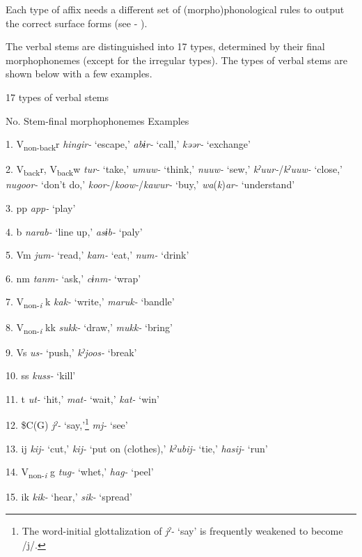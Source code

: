 Each type of affix needs a different set of (morpho)phonological rules to output the correct surface forms (see  - ).

The verbal stems are distinguished into 17 types, determined by their final morphophonemes (except for the irregular types). The types of verbal stems are shown below with a few examples.

\begin{table}
\caption{\label{tab:key:57}17 types of verbal stems}

No.  Stem-final morphophonemes  Examples

1.  V\textsubscript{non-back}r  \textit{hingir-} ‘escape,’ \textit{abɨr-} ‘call,’ \textit{kəər-} ‘exchange’

2.  V\textsubscript{back}r, V\textsubscript{back}w  \textit{tur-} ‘take,’ \textit{umuw-} ‘think,’ \textit{nuuw-} ‘sew,’ \textit{kˀuur-}/\textit{kˀuuw-} ‘close,’ \textit{nugoor-} ‘don’t do,’ \textit{koor-}/\textit{koow-}/\textit{kawur-} ‘buy,’ \textit{wa}(\textit{k})\textit{ar-} ‘understand’

3.  pp  \textit{app-} ‘play’

4.  b  \textit{narab-} ‘line up,’ \textit{asɨb-} ‘paly’

5.  Vm  \textit{jum-} ‘read,’ \textit{kam-} ‘eat,’ \textit{num-} ‘drink’

6.  nm  \textit{tanm-} ‘ask,’ \textit{cɨnm-} ‘wrap’

7.  V\textsubscript{non-}\textit{\textsubscript{i} }k  \textit{kak-} ‘write,’ \textit{maruk-} ‘bandle’

8.  V\textsubscript{non-}\textit{\textsubscript{i} }kk  \textit{sukk-} ‘draw,’ \textit{mukk-} ‘bring’

9.  Vs  \textit{us-} ‘push,’ \textit{kˀjoos-} ‘break’

10.  ss  \textit{kuss-} ‘kill’

11.  t  \textit{ut-} ‘hit,’ \textit{mat-} ‘wait,’ \textit{kat-} ‘win’

12.  \$C(G)  \textit{jˀ-} ‘say,’\footnote{The word-initial glottalization of \textit{jˀ-} ‘say’ is frequently weakened to become /j/.} \textit{mj-} ‘see’

13.  ij  \textit{kij-} ‘cut,’ \textit{kij-} ‘put on (clothes),’ \textit{kˀubij-} ‘tie,’ \textit{hasij-} ‘run’

14.  V\textsubscript{non-}\textit{\textsubscript{i} }g  \textit{tug-} ‘whet,’ \textit{hag-} ‘peel’

15.  ik  \textit{kik-} ‘hear,’ \textit{sik-} ‘spread’


\end{table}
